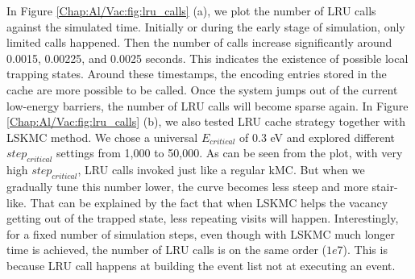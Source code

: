 In Figure \ref{Chap:Al/Vac:fig:lru_calls} (a), we plot the number of \ac{LRU} calls against the simulated time. Initially or during the early stage of simulation, only limited calls happened. Then the number of calls increase significantly around 0.0015, 0.00225, and 0.0025 seconds. This indicates the existence of possible local trapping states. Around these timestamps, the encoding entries stored in the cache are more possible to be called. Once the system jumps out of the current low-energy barriers, the number of \ac{LRU} calls will become sparse again. In Figure \ref{Chap:Al/Vac:fig:lru_calls} (b), we also tested \ac{LRU} cache strategy together with \ac{LSKMC} method. We chose a universal $E_{critical}$ of $0.3$ eV and explored different $step_{critical}$ settings from 1,000 to 50,000. As can be seen from the plot, with very high $step_{critical}$, \ac{LRU} calls invoked just like a regular \ac{kMC}. But when we gradually tune this number lower, the curve becomes less steep and more stair-like. That can be explained by the fact that when \ac{LSKMC} helps the vacancy getting out of the trapped state, less repeating visits will happen. Interestingly, for a fixed number of simulation steps, even though with \ac{LSKMC} much longer time is achieved, the number of \ac{LRU} calls is on the same order ($1e7$). This is because \ac{LRU} call happens at building the event list not at executing an event.

